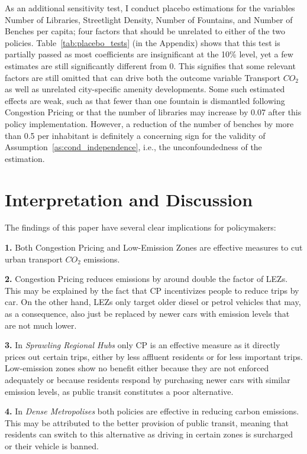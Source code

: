 \documentclass[12pt, a4paper]{article}
\begin{document}
As an additional sensitivity test, I conduct placebo estimations for the variables Number of Libraries, Streetlight Density, Number of Fountains, and Number of Benches per capita; four factors that should be unrelated to either of the two policies. Table~\ref{tab:placebo_tests} (in the Appendix) shows that this test is partially passed as most coefficients are insignificant at the 10\% level, yet a few estimates are still significantly different from 0. This signifies that some relevant factors are still omitted that can drive both the outcome variable Transport $CO_2$ as well as unrelated city-specific amenity developments. Some such estimated effects are weak, such as that fewer than one fountain is dismantled following Congestion Pricing or that the number of libraries may increase by 0.07 after this policy implementation. However, a reduction of the number of benches by more than 0.5 per inhabitant is definitely a concerning sign for the validity of Assumption~\ref{as:cond_independence}, i.e., the unconfoundedness of the estimation. 

\section{Interpretation and Discussion}
\label{sec:conclusion}

The findings of this paper have several clear implications for policymakers:

\textbf{1. } Both Congestion Pricing and Low-Emission Zones are effective measures to cut urban transport $CO_2$ emissions.

\textbf{2. } Congestion Pricing reduces emissions by around double the factor of LEZs. This may be explained by the fact that CP incentivizes people to reduce trips by car. On the other hand, LEZs only target older diesel or petrol vehicles that may, as a consequence, also just be replaced by newer cars with emission levels that are not much lower.

\textbf{3. } In \textit{Sprawling Regional Hubs} only CP is an effective measure as it directly prices out certain trips, either by less affluent residents or for less important trips. Low-emission zones show no benefit either because they are not enforced adequately or because residents respond by purchasing newer cars with similar emission levels, as public transit constitutes a poor alternative.

\textbf{4. } In \textit{Dense Metropolises} both policies are effective in reducing carbon emissions. This may be attributed to the better provision of public transit, meaning that residents can switch to this alternative as driving in certain zones is surcharged or their vehicle is banned.
\end{document}
